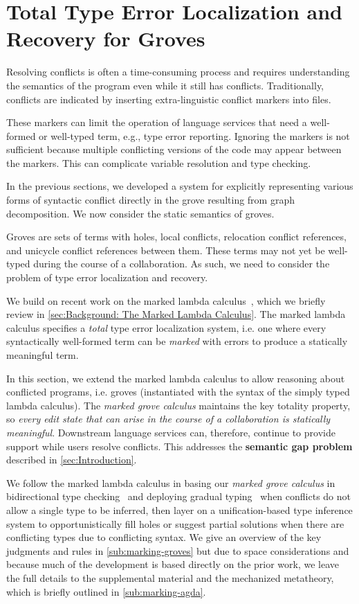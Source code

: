 
\section{Total Type Error Localization and Recovery for Groves}%
\label{sec:Marking System}

Resolving conflicts is often a time-consuming process 
and requires understanding the semantics of the program
even while it still has conflicts. Traditionally, conflicts are indicated by inserting extra-linguistic conflict markers into files. 

These markers can limit the operation of language services that need a well-formed or well-typed term, 
e.g., type error reporting. Ignoring the markers is not sufficient because 
multiple conflicting versions of the code may appear between the markers. This can complicate variable resolution and type checking.

In the previous sections, we developed a system for explicitly representing various forms of syntactic conflict directly in the grove resulting from graph decomposition. We now consider the static semantics of 
groves.

Groves are sets of terms with holes, local conflicts, relocation conflict references, and unicycle conflict references between them. These terms may not yet be well-typed during the course of a collaboration. 
As such, we need to consider the problem of type error localization and recovery. 

We build on recent work on the marked lambda calculus~\cite{DBLP:journals/pacmpl/ZhaoMDBPO24}, which we briefly review in \autoref{sec:Background: The Marked Lambda Calculus}. 
The marked lambda calculus specifies a \emph{total} 
type error localization system, i.e. one where every syntactically well-formed term can be \emph{marked} with errors to produce a statically meaningful term.

In this section, we extend the marked lambda calculus to allow reasoning about conflicted programs, i.e. groves (instantiated with the syntax of the simply typed lambda calculus). 
The \emph{marked grove calculus} maintains the key totality property, so \emph{every edit state that can arise in the course of a collaboration is statically meaningful}. Downstream language services can, therefore, continue to provide support while users resolve conflicts. This addresses the \textbf{semantic gap problem} described in \autoref{sec:Introduction}.

We follow the marked lambda calculus in basing our \emph{marked grove calculus} in bidirectional type checking~\cite{10.1145/3450952} and deploying gradual typing~\cite{siek2015} when conflicts do not allow a single type to be inferred, then layer on a unification-based type inference system to opportunistically fill holes or suggest partial solutions when there are conflicting types due to conflicting syntax. We give an overview of the key judgments and rules in \autoref{sub:marking-groves} but due to space considerations and because much of the development is based directly on the prior work, we leave the full details to the supplemental material and the mechanized metatheory, which is briefly outlined in \ref{sub:marking-agda}.

